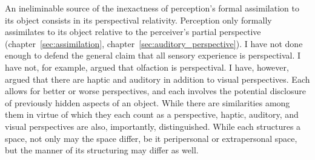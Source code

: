 An ineliminable source of the inexactness of perception's formal assimilation to its object consists in its perspectival relativity. Perception only formally assimilates to its object relative to the perceiver's partial perspective (chapter~\ref{sec:assimilation}, chapter~\ref{sec:auditory_perspective}). I have not done enough to defend the general claim that all sensory experience is perspectival. I have not, for example, argued that olfaction is perspectival. I have, however, argued that there are haptic and auditory in addition to visual perspectives. Each allows for better or worse perspectives, and each involves the potential disclosure of previously hidden aspects of an object. While there are similarities among them in virtue of which they each count as a perspective, haptic, auditory, and visual perspectives are also, importantly, distinguished. While each structures a space, not only may the space differ, be it peripersonal or extrapersonal space, but the manner of its structuring may differ as well.


